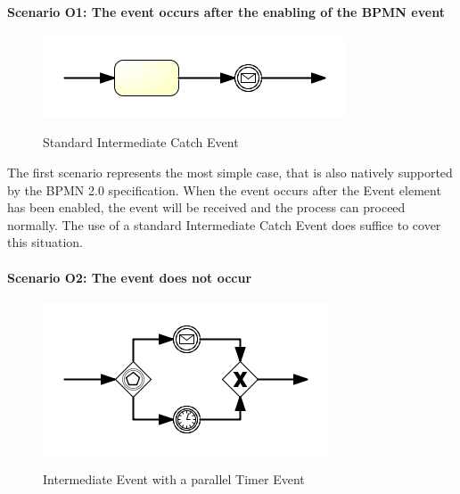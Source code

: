 \paragraph{Scenario O1: The event occurs after the enabling of the BPMN event}
\begin{figure}[]
	\myfloatalign
	{\includegraphics[width=1\linewidth]{chapters/assessment/standard-intermediate-event.png}}
	\caption{Standard Intermediate Catch Event}\label{fig:excerpt-standard-event}
\end{figure}

The first scenario represents the most simple case, that is also natively supported by the BPMN 2.0 specification. When the event occurs after the Event element has been enabled, the event will be received and the process can proceed normally. The use of a standard Intermediate Catch Event does suffice to cover this situation.

\paragraph{Scenario O2: The event does not occur}
\begin{figure}[]
	\myfloatalign
	{\includegraphics[width=1\linewidth]{chapters/assessment/parallel-timer-event.png}}
	\caption{Intermediate Event with a parallel Timer Event}\label{fig:excerpt-event-with-timer}
\end{figure}

